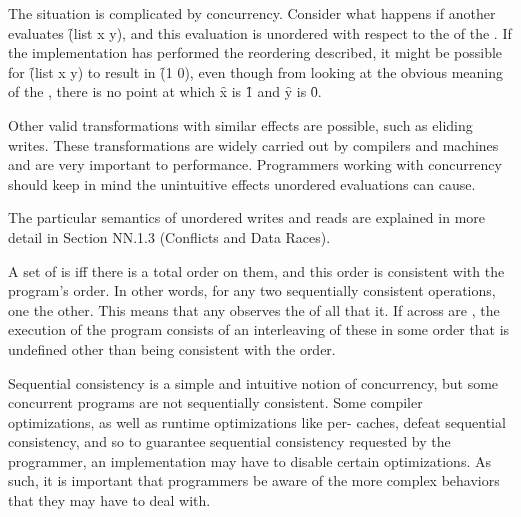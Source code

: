 The situation is complicated by concurrency. Consider what happens if
another  evaluates \f{(list x y)}, and this evaluation is
unordered with respect to the  of the 
. If the implementation has performed the reordering
described, it might be possible for \f{(list x y)} to result in \f{(1
  0)}, even though from looking at the obvious meaning of the
 , there is no point at which \f{x} is \f{1}
and \f{y} is \f{0}.

Other valid transformations with similar effects are possible, such as
eliding writes. These transformations are widely carried out by
compilers and machines and are very important to
performance. Programmers working with concurrency should keep in mind
the unintuitive effects unordered evaluations can cause.

The particular semantics of unordered writes and reads are explained
in more detail in Section NN.1.3 (Conflicts and Data Races).

\endsubsubsection%


A set of  is  iff
there is a total order on them, and this order is consistent with the
program's  order. In other words, for any two
sequentially consistent operations, one  the
other. This means that any 
 observes the  of all
  that
 it. If  across 
are , the execution of the program
consists of an interleaving of these  in some order
that is undefined other than being consistent with the
 order.

Sequential consistency is a simple and intuitive notion of
concurrency, but some concurrent programs are not sequentially
consistent. Some compiler optimizations, as well as runtime
optimizations like per- caches, defeat sequential
consistency, and so to guarantee sequential consistency requested by
the programmer, an implementation may have to disable certain
optimizations. As such, it is important that programmers be aware of
the more complex behaviors that they may have to deal with.

\endsubsubsection%

